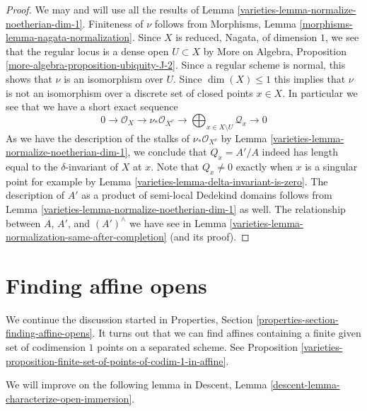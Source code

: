 \begin{proof}

We may and will use all the results of
Lemma \ref{varieties-lemma-normalize-noetherian-dim-1}.
Finiteness of $\nu$ follows from
Morphisms, Lemma \ref{morphisms-lemma-nagata-normalization}.
Since $X$ is reduced, Nagata, of dimension $1$, we see that the
regular locus is a dense open $U \subset X$ by
More on Algebra, Proposition \ref{more-algebra-proposition-ubiquity-J-2}.
Since a regular scheme is normal, this shows that $\nu$
is an isomorphism over $U$.
Since $\dim(X) \leq 1$ this implies that $\nu$ is not an isomorphism
over a discrete set of closed points $x \in X$.
In particular we see that we have a short exact sequence
$$
0 \to \mathcal{O}_X \to \nu_*\mathcal{O}_{X^\nu} \to
\bigoplus\nolimits_{x \in X \setminus U} \mathcal{Q}_x \to 0
$$
As we have the description of the stalks of $\nu_*\mathcal{O}_{X^\nu}$
by Lemma \ref{varieties-lemma-normalize-noetherian-dim-1}, we conclude that
$Q_x = A'/A$ indeed has length equal to the $\delta$-invariant of $X$ at $x$.
Note that $Q_x \not = 0$ exactly when $x$ is a singular point for
example by Lemma \ref{varieties-lemma-delta-invariant-is-zero}.
The description of $A'$ as a product of semi-local Dedekind domains follows
from Lemma \ref{varieties-lemma-normalize-noetherian-dim-1} as well.
The relationship between $A$, $A'$, and $(A')^\wedge$
we have see in Lemma \ref{varieties-lemma-normalization-same-after-completion}
(and its proof).
\end{proof}

\section{Finding affine opens}
\label{varieties-section-finding-affine-opens}
We continue the discussion started in
Properties, Section \ref{properties-section-finding-affine-opens}.
It turns out that we can find affines containing a finite given set
of codimension $1$ points on a separated scheme. See
Proposition \ref{varieties-proposition-finite-set-of-points-of-codim-1-in-affine}.

\medskip\noindent
We will improve on the following lemma in
Descent, Lemma \ref{descent-lemma-characterize-open-immersion}.

